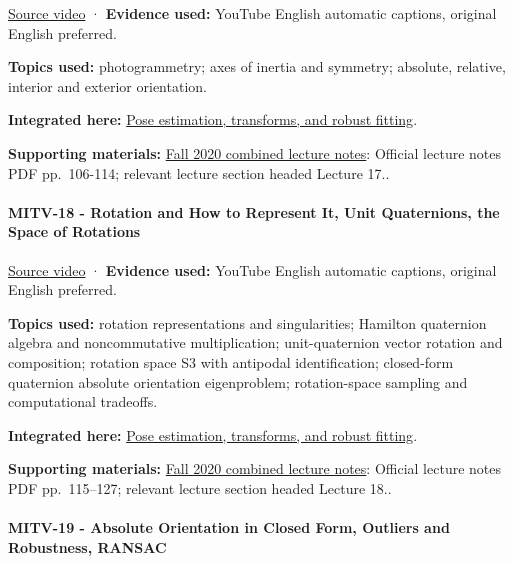 \href{https://www.youtube.com/watch?v=R8O0vlHBeNc}{Source video} · \textbf{Evidence used:} YouTube English automatic captions, original English preferred.

\textbf{Topics used:} photogrammetry; axes of inertia and symmetry; absolute, relative, interior and exterior orientation.

\textbf{Integrated here:} \hyperref[04-visual-computing-ii-ch032]{Pose estimation, transforms, and robust fitting}.

\textbf{Supporting materials:} \href{https://ocw.mit.edu/courses/6-801-machine-vision-fall-2020/9ec44f69e72995c370b3797818ba01e6_MIT6_801F20_lectureNotes.pdf}{Fall 2020 combined lecture notes}: Official lecture notes PDF pp.~106-114; relevant lecture section headed Lecture 17..

\paragraph{MITV-18 - Rotation and How to Represent It, Unit Quaternions, the Space of Rotations}\label{mitv-18---rotation-and-how-to-represent-it-unit-quaternions-the-space-of-rotations}

\href{https://www.youtube.com/watch?v=uiG6KY0Cqd8}{Source video} · \textbf{Evidence used:} YouTube English automatic captions, original English preferred.

\textbf{Topics used:} rotation representations and singularities; Hamilton quaternion algebra and noncommutative multiplication; unit-quaternion vector rotation and composition; rotation space S3 with antipodal identification; closed-form quaternion absolute orientation eigenproblem; rotation-space sampling and computational tradeoffs.

\textbf{Integrated here:} \hyperref[04-visual-computing-ii-ch032]{Pose estimation, transforms, and robust fitting}.

\textbf{Supporting materials:} \href{https://ocw.mit.edu/courses/6-801-machine-vision-fall-2020/9ec44f69e72995c370b3797818ba01e6_MIT6_801F20_lectureNotes.pdf}{Fall 2020 combined lecture notes}: Official lecture notes PDF pp.~115--127; relevant lecture section headed Lecture 18..

\paragraph{MITV-19 - Absolute Orientation in Closed Form, Outliers and Robustness, RANSAC}\label{mitv-19---absolute-orientation-in-closed-form-outliers-and-robustness-ransac}

